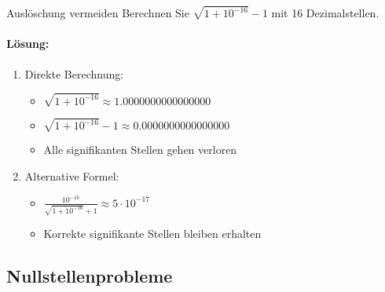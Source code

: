 \begin{example2}{Auslöschung vermeiden}
Berechnen Sie $\sqrt{1+10^{-16}}-1$ mit 16 Dezimalstellen.

\paragraph{Lösung:}
\begin{enumerate}
    \item Direkte Berechnung:
    \begin{itemize}
        \item $\sqrt{1+10^{-16}} \approx 1.0000000000000000$
        \item $\sqrt{1+10^{-16}}-1 \approx 0.0000000000000000$
        \item Alle signifikanten Stellen gehen verloren
    \end{itemize}
    \item Alternative Formel:
    \begin{itemize}
        \item $\frac{10^{-16}}{\sqrt{1+10^{-16}}+1} \approx 5 \cdot 10^{-17}$
        \item Korrekte signifikante Stellen bleiben erhalten
    \end{itemize}
\end{enumerate}
\end{example2}

\raggedcolumns

\subsection{Nullstellenprobleme}

